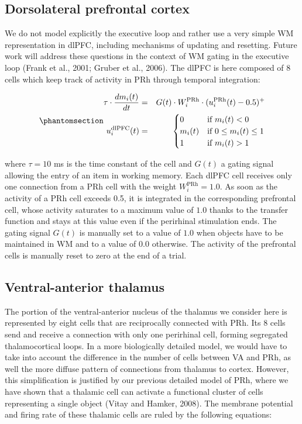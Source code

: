 \documentclass[
  11pt,
  a4paper,
]{scrbook}
\begin{document}
\subsection{Dorsolateral prefrontal
cortex}\label{dorsolateral-prefrontal-cortex}

We do not model explicitly the executive loop and rather use a very
simple WM representation in dlPFC, including mechanisms of updating and
resetting. Future work will address these questions in the context of WM
gating in the executive loop (Frank et al., 2001; Gruber et al., 2006).
The dlPFC is here composed of 8 cells which keep track of activity in
PRh through temporal integration:

\begin{equation}\phantomsection\label{eq-ficn:mp-pfc}{
\begin{aligned}
    \tau \cdot \frac{d m_i(t)}{d t}  & = & G(t) \cdot  W^{\text{PRh}}_{i} \cdot ( u^{\text{PRh}}_i(t) - 0.5 )^+  \\
    u^{\text{dlPFC}}_i(t) & = &
     \begin{cases}
        0 & \text{if $m_i(t) < 0$}  \\
        m_i(t)  & \text{if $0 \leq m_i(t) \leq 1$} \\
        1 & \text{if $m_i(t) > 1$}
     \end{cases}
\end{aligned}
}\end{equation}

where \(\tau =10\) ms is the time constant of the cell and \(G(t)\) a
gating signal allowing the entry of an item in working memory. Each
dlPFC cell receives only one connection from a PRh cell with the weight
\(W^{\text{PRh}}_{i} = 1.0\). As soon as the activity of a PRh cell
exceeds 0.5, it is integrated in the corresponding prefrontal cell,
whose activity saturates to a maximum value of \(1.0\) thanks to the
transfer function and stays at this value even if the perirhinal
stimulation ends. The gating signal \(G(t)\) is manually set to a value
of \(1.0\) when objects have to be maintained in WM and to a value of
\(0.0\) otherwise. The activity of the prefrontal cells is manually
reset to zero at the end of a trial.

\subsection{Ventral-anterior thalamus}\label{ventral-anterior-thalamus}

The portion of the ventral-anterior nucleus of the thalamus we consider
here is represented by eight cells that are reciprocally connected with
PRh. Its 8 cells send and receive a connection with only one perirhinal
cell, forming segregated thalamocortical loops. In a more biologically
detailed model, we would have to take into account the difference in the
number of cells between VA and PRh, as well the more diffuse pattern of
connections from thalamus to cortex. However, this simplification is
justified by our previous detailed model of PRh, where we have shown
that a thalamic cell can activate a functional cluster of cells
representing a single object (Vitay and Hamker, 2008). The membrane
potential and firing rate of these thalamic cells are ruled by the
following equations:
\end{document}
